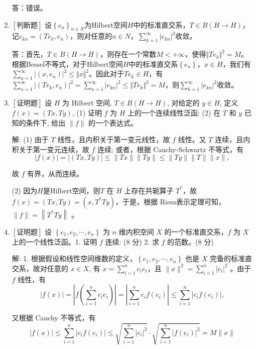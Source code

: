 \documentclass{article}
\begin{document}
\begin{enumerate}
    答：错误。
    
    \item $\left[\textbf{判断题}\right]$ 设$\left\{e_n\right\}_{n\in N}$为Hilbert空间$H$中的标准直交系，$T\in B(H\to H)$，记$e_{kn}=(Te_k, e_n)$，则对任意的$n\in N$，$\sum_{k=1}^{\infty}\left|e_{kn}\right|^2$收敛。

    答：首先，$T\in B(H\to H)$，则存在一个常数$M < +\infty$，使得$\Vert Te_k\Vert ^ 2 = M$。根据Bessel不等式，对于Hilbert空间$H$中的标准直交系$\left\{e_n\right\}$，$x\in H$，我们有$\sum_{n=1}^{\infty}{\left|(x, e_n) \right|}^2 \leq {\Vert x \Vert} ^ 2$。因此对于$Te_k \in H$，有$\sum_{n=1}^{\infty}{\left|(Te_k, e_n) \right|}^2 = \sum_{n=1}^{\infty}{\left|e_{kn} \right|}^2 \leq {\Vert Te_k \Vert} ^ 2 = M$，则$\sum_{k=1}^{\infty}\left|e_{kn}\right|^2$收敛。

    
    \item $\left[\textbf{证明题}\right]$ 设 $H$ 为 Hilbert 空间, $T \in B(H \rightarrow H)$, 对给定的 $y \in H$, 定义 $f(x)=(T x, T y)$, (1) 证明 $f$ 为 $H$ 上的一个连续线性泛函: (2) 在 $T$ 和 $y$ 已知的条件下, 给出 $\|f\|$ 的一个表达式。

解: (1) 由于 $T$ 线性，且内积关于第一变元线性，故 $f$ 线性。又 $T$ 连续，且内积关于第一变元连续，故 $f$ 连续; 或者，根据 Cauchy-Schwartz 不等式，有
$$
|f(x)|=|(T x, T y)| \leq\|T x\|\|T y\| \leq\|T y\|\|T\|\|x\|,
$$

故 $f$ 有界，从而连续。

(2) 因为$H$是Hilbert空间，则$T$ 在 $H$ 上存在共轭算子 $T^*$，故 $f(x)=(T x, T y)=\left(x, T^* T y\right)$，于是，根据 Riesz表示定理可知，$\|f\|=\left\|T^* T y\right\|$ 。

    \item $\left[\textbf{证明题}\right]$ 设 $\left\{e_1, e_2, \cdots, e_n\right\}$ 为 $n$ 维内积空间 $X$ 的一个标准直交系，$f$ 为 $X$ 上的一个线性泛函。1. 证明 $f$ 连续: (8 分) 2. 求 $f$ 的范数。(8 分)

解: 1. 根据假设和线性空间维数的定义，$\left\{e_1, e_2, \cdots, e_n\right\}$ 也是 $X$ 完备的标准直交系，故对任意的 $x \in X$, 有 $x=\sum_{i=1}^n c_i e_i$，且 $\|x\|^2=\sum_{i=1}^n\left|c_i\right|^2$ 。由于 $f$ 线性，有
$$
\left|f(x)\right|=\left|f(\sum_{i=1}^n c_i e_i)\right|=\left|\sum_{i=1}^n c_i f\left(e_i\right)\right| \leq \sum_{i=1}^n\left|c_i f\left(e_i\right)\right|,
$$

又根据 Cauchy 不等式，有
$$
\left|f(x)\right| \leq \sum_{i=1}^n\left|c_i f\left(e_i\right)\right| \leq \sqrt{\sum_{i=1}^n\left|c_i\right|^2} \cdot \sqrt{\sum_{i=1}^n\left|f\left(e_i\right)\right|^2}=M\|x\|
$$


\end{enumerate}
\end{document}
